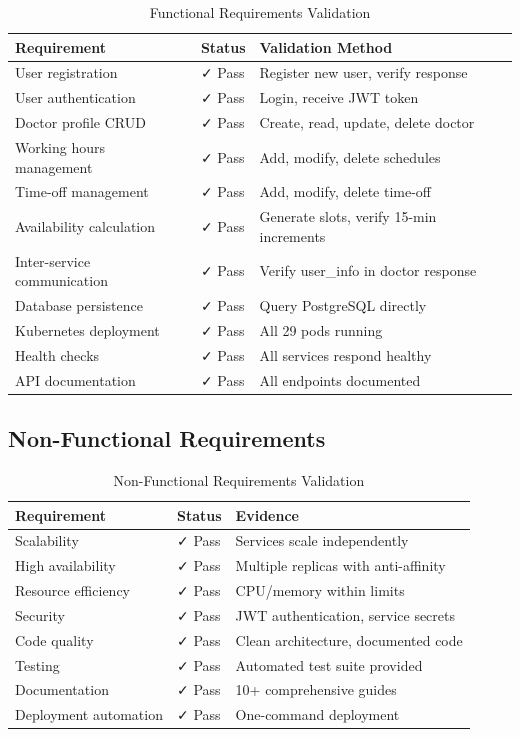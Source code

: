 \documentclass[12pt,a4paper]{article}
\begin{document}
\begin{table}[h]
\centering
\small
\begin{tabular}{@{}p{5cm}p{1.5cm}p{5cm}@{}}
\toprule
\textbf{Requirement} & \textbf{Status} & \textbf{Validation Method} \\
\midrule
User registration & ✓ Pass & Register new user, verify response \\
User authentication & ✓ Pass & Login, receive JWT token \\
Doctor profile CRUD & ✓ Pass & Create, read, update, delete doctor \\
Working hours management & ✓ Pass & Add, modify, delete schedules \\
Time-off management & ✓ Pass & Add, modify, delete time-off \\
Availability calculation & ✓ Pass & Generate slots, verify 15-min increments \\
Inter-service communication & ✓ Pass & Verify user\_info in doctor response \\
Database persistence & ✓ Pass & Query PostgreSQL directly \\
Kubernetes deployment & ✓ Pass & All 29 pods running \\
Health checks & ✓ Pass & All services respond healthy \\
API documentation & ✓ Pass & All endpoints documented \\
\bottomrule
\end{tabular}
\caption{Functional Requirements Validation}
\end{table}

\subsection{Non-Functional Requirements}

\begin{table}[h]
\centering
\small
\begin{tabular}{@{}p{5cm}p{1.5cm}p{5cm}@{}}
\toprule
\textbf{Requirement} & \textbf{Status} & \textbf{Evidence} \\
\midrule
Scalability & ✓ Pass & Services scale independently \\
High availability & ✓ Pass & Multiple replicas with anti-affinity \\
Resource efficiency & ✓ Pass & CPU/memory within limits \\
Security & ✓ Pass & JWT authentication, service secrets \\
Code quality & ✓ Pass & Clean architecture, documented code \\
Testing & ✓ Pass & Automated test suite provided \\
Documentation & ✓ Pass & 10+ comprehensive guides \\
Deployment automation & ✓ Pass & One-command deployment \\
\bottomrule
\end{tabular}
\caption{Non-Functional Requirements Validation}
\end{table}
\end{document}
